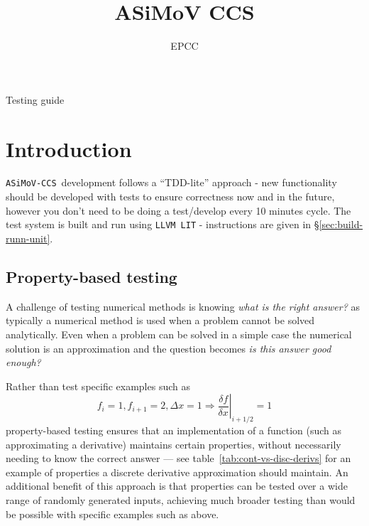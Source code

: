 \documentclass[11pt]{article}
\newcommand{\accs}{\texttt{ASiMoV-CCS}}
\begin{document}
\lstset{style=codefragment}

\title{ASiMoV CCS}

\author{EPCC}

\makeEPCCtitle

\centerline{\sc Testing guide}

\tableofcontents
\pagebreak

\bigskip


\bigskip


\section{Introduction}

\accs\ development follows a ``TDD-lite'' approach - new functionality should be developed with
tests to ensure correctness now and in the future, however you don't need to be doing a test/develop
every 10 minutes cycle.
The test system is built and run using \texttt{LLVM LIT} - instructions are given in \S\ref{sec:build-runn-unit}.


\subsection{Property-based testing}
\label{subsec:prop-based-test}

A challenge of testing numerical methods is knowing \textit{what is the right answer?} as typically
a numerical method is used when a problem cannot be solved analytically.
Even when a problem can be solved in a simple case the numerical solution is an approximation and
the question becomes \textit{is this answer good enough?}

Rather than test specific examples such as
\begin{equation}
  f_i=1, f_{i+1}=2, \Delta{}x=1 \Rightarrow \left. \frac{\delta f}{\delta x} \right|_{i+1/2} = 1
\end{equation}
property-based testing ensures that an implementation of a function (such as approximating a
derivative) maintains certain properties, without necessarily needing to know the correct answer ---
see table~\ref{tab:cont-vs-disc-derivs} for an example of properties a discrete derivative
approximation should maintain.
An additional benefit of this approach is that properties can be tested over a wide range of
randomly generated inputs, achieving much broader testing than would be possible with specific
examples such as above.
\end{document}
